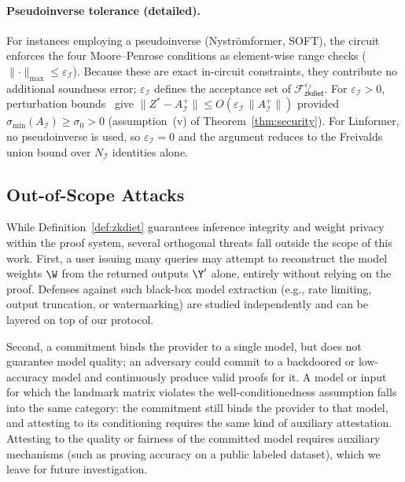 \paragraph{Pseudoinverse tolerance (detailed).}
For instances employing a pseudoinverse (Nystr\"{o}mformer, SOFT), the circuit enforces the four Moore--Penrose conditions as element-wise range checks ($\lVert\cdot\rVert_{\max}\leq\varepsilon_\mathcal{I}$). Because these are exact in-circuit constraints, they contribute no additional soundness error; $\varepsilon_\mathcal{I}$ defines the acceptance set of $\mathcal{F}^{\varepsilon_\mathcal{I}}_{\mathsf{zkdiet}}$.
For $\varepsilon_\mathcal{I} > 0$, perturbation bounds~\cite{stewart1990matrix} give
$\|Z^{*} - A_\mathcal{I}^{+}\| \le O(\varepsilon_\mathcal{I}\,\|A_\mathcal{I}^{+}\|)$
provided $\sigma_{\min}(A_\mathcal{I}) \geq \sigma_0 > 0$
(assumption~(v) of Theorem~\ref{thm:security}). For Linformer, no pseudoinverse is used, so $\varepsilon_\mathcal{I}{=}0$ and the argument reduces to the Freivalds union bound over $N_\mathcal{I}$ identities alone.

\subsection{Out-of-Scope Attacks}
\label{appx:out-of-scope}

While Definition~\ref{def:zkdiet} guarantees inference integrity and weight privacy within the proof system, several orthogonal threats fall outside the scope of this work. First, a user issuing many queries may attempt to reconstruct the model weights $\W$ from the returned outputs $\Y'$ alone, entirely without relying on the proof. Defenses against such black-box model extraction (e.g., rate limiting, output truncation, or watermarking) are studied independently and can be layered on top of our protocol.

Second, a commitment binds the provider to a single model, but does not guarantee model quality; an adversary could commit to a backdoored or low-accuracy model and continuously produce valid proofs for it. A model or input for which the landmark matrix violates the well-conditionedness assumption falls into the same category: the commitment still binds the provider to that model, and attesting to its conditioning requires the same kind of auxiliary attestation. Attesting to the quality or fairness of the committed model requires auxiliary mechanisms (such as proving accuracy on a public labeled dataset), which we leave for future investigation.
